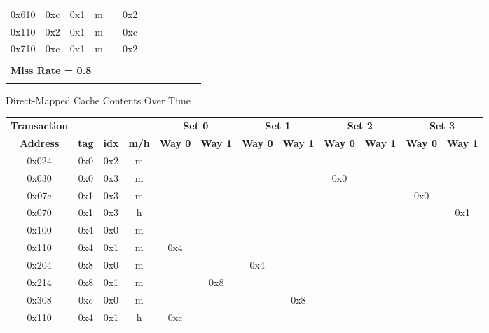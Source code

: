 \documentclass[10pt]{article}
\begin{document}
\begin{figure}[H]
\begin{tabular}{@{\extracolsep{3pt}}cccccccccccc@{}}
0x610 & 0xc & 0x1 & m &     & 0x2 &     &     &     &     &     &     \\
0x110 & 0x2 & 0x1 & m &     & 0xc &     &     &     &     &     &     \\
0x710 & 0xe & 0x1 & m &     & 0x2 &     &     &     &     &     &     \\
\Xhline{2\arrayrulewidth}
\multicolumn{12}{l}{\textbf{Number of Misses = 16}} \\
\hline
\multicolumn{12}{l}{\textbf{Miss Rate = 0.8}} \\
\Xhline{2\arrayrulewidth}
\end{tabular}
\caption{Direct-Mapped Cache Contents Over Time}
\end{figure}

\begin{figure}[H]
\centering
{\setlength{\tabcolsep}{2pt}
\begin{tabular}{@{\extracolsep{3pt}}cccccccccccc@{}}
\Xhline{2\arrayrulewidth}
\textbf{Transaction} & & & & \multicolumn{2}{c}{\textbf{Set 0}} & \multicolumn{2}{c}{\textbf{Set 1}} & \multicolumn{2}{c}{\textbf{Set 2}} & \multicolumn{2}{c}{\textbf{Set 3}} \\
\cline{5-6}
\cline{7-8}
\cline{9-10}
\cline{11-12}
\textbf{Address} & \textbf{tag} & \textbf{idx} & \textbf{m/h} & \textbf{Way 0} & \textbf{Way 1} & \textbf{Way 0} & \textbf{Way 1} & \textbf{Way 0} & \textbf{Way 1} & \textbf{Way 0} & \textbf{Way 1} \\
\Xhline{2\arrayrulewidth}
0x024 & 0x0 & 0x2 & m &  -  &  -  &  -  &  -  &  -  &  -  &  -  &  -  \\
0x030 & 0x0 & 0x3 & m &     &     &     &     & 0x0 &     &     &     \\
0x07c & 0x1 & 0x3 & m &     &     &     &     &     &     & 0x0 &     \\
0x070 & 0x1 & 0x3 & h &     &     &     &     &     &     &     & 0x1 \\
0x100 & 0x4 & 0x0 & m &     &     &     &     &     &     &     &     \\
0x110 & 0x4 & 0x1 & m & 0x4 &     &     &     &     &     &     &     \\
0x204 & 0x8 & 0x0 & m &     &     & 0x4 &     &     &     &     &     \\
0x214 & 0x8 & 0x1 & m &     & 0x8 &     &     &     &     &     &     \\
0x308 & 0xc & 0x0 & m &     &     &     & 0x8 &     &     &     &     \\
0x110 & 0x4 & 0x1 & h & 0xc &     &     &     &     &     &     &     \\

\end{tabular}}
\end{figure}
\end{document}
